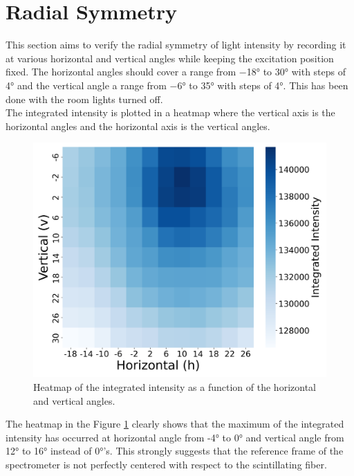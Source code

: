     

    \section{Radial Symmetry}
    This section aims to verify the radial symmetry of light intensity by recording it at various horizontal and vertical angles while keeping the excitation position fixed. The horizontal angles should cover a range from −18° to 30° with steps of 4° and the vertical angle a range from −6° to 35° with steps of 4°. This has been done with the room lights turned off. \\

    The integrated intensity is plotted in a heatmap where the vertical axis is the horizontal angles and the horizontal axis is the vertical angles. 

    \begin{figure}[H]
        \centering
        \includegraphics[scale=0.25]{Figure/heatmap.png}
        \caption{Heatmap of the integrated intensity as a function of the horizontal and vertical
        angles.}
        \label{radial}
    \end{figure}

    The heatmap in the Figure \ref{radial} clearly shows that the maximum of the integrated intensity has occurred at horizontal angle from -4° to 0° and vertical angle from 12° to 16° instead of 0°'s. This strongly suggests that the reference frame of the spectrometer is not perfectly centered with respect to the scintillating fiber.
    
